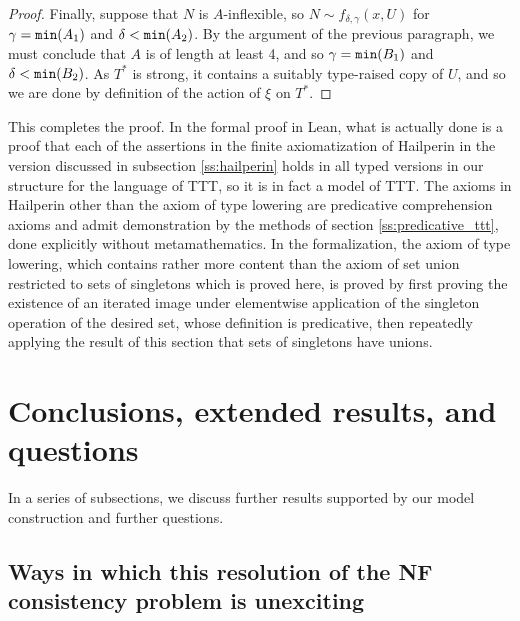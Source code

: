 \documentclass{article}
\theoremstyle{definition}
\theoremstyle{remark}
\begin{document}
{\begin{proof}
Finally, suppose that $N$ is $A$-inflexible, so $N \sim f_{\delta,\gamma}(x, U)$ for $\gamma = {\tt min}(A_1)$ and $\delta < {\tt min}(A_2)$.
By the argument of the previous paragraph, we must conclude that $A$ is of length at least 4, and so $\gamma = {\tt min}(B_1)$ and $\delta < {\tt min}(B_2)$.
As $T^*$ is strong, it contains a suitably type-raised copy of $U$, and so we are done by definition of the action of $\xi$ on $T^*$.

\end{proof}

This completes the proof.  In the formal proof in Lean, what is actually done is a proof that each of the assertions in the finite axiomatization of Hailperin in the version discussed in subsection \ref{ss:hailperin}  holds in all typed versions in our structure for the language of TTT, so it is in fact a model of TTT.  The axioms in Hailperin other than the axiom of type lowering are predicative comprehension axioms and
admit demonstration by the methods of section \ref{ss:predicative_ttt}, done explicitly without metamathematics.  In the formalization, the axiom of type lowering, which contains rather more content than the axiom of set union restricted to sets of singletons which is proved here, is proved by first proving the existence of an iterated image under elementwise application of the singleton operation of the desired set, whose definition is predicative, then repeatedly applying the result of this section that sets of singletons have unions.
















\newpage

\section{Conclusions, extended results, and questions}

In a series of subsections, we discuss further results supported by our model construction and further questions.

\subsection{Ways in which this resolution of the NF consistency problem is unexciting}

}
\end{document}
